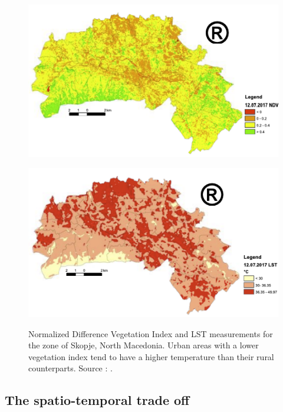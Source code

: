     \begin{figure}[H]
        \centering
        \begin{minipage}{0.5\textwidth}
            \centering
            \includegraphics[width=\textwidth]{includes/1-skopje-NDVI.png}
            \label{fig:1-skopje-NDVI}
        \end{minipage}\hfill
        \begin{minipage}{0.5\textwidth}
            \centering
            \includegraphics[width=\textwidth]{includes/1-skopje-LST.png}
            \label{fig:1-skopje-LST}
        \end{minipage}
        \caption{Normalized Difference Vegetation Index \cite{Rouse1973MonitoringVS} and LST measurements for the zone of Skopje, North Macedonia. Urban areas with a lower vegetation index tend to have a higher temperature than their rural counterparts. Source : \cite{skopje2018}.} 
        \label{fig:1-skopie-UHI}
    \end{figure}


    \subsection{The spatio-temporal trade off}

